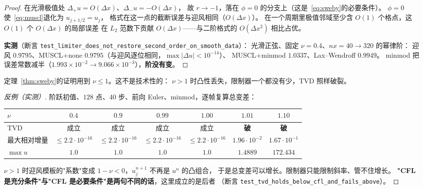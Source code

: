 \begin{proof}
在光滑极值处 $\Delta_+u=O(\Delta x)$、$\Delta_-u=-O(\Delta x)$，
故 $r\to-1$，落在 $\phi=0$ 的分支上（这是~\eqref{eq:sweby}的必要条件）。
$\phi=0$ 使~\eqref{eq:muscl}退化为 $u_{j+1/2}=u_j$，
格式在这一点的截断误差与迎风相同（$O(\Delta x)$）。
在一个周期里极值邻域至少含 $O(1)$ 个格点，这 $O(1)$ 个 $O(\Delta x)$ 的局部误差
在 $L_2$ 范数下贡献 $O(\Delta x)$——与二阶格式的 $O(\Delta x^2)$ 相比占优。

\textbf{实测}（断言 \texttt{test\_limiter\_does\_not\_restore\_second\_order\_on\_smooth\_data}）：
光滑正弦、固定 $\nu=0.4$、$nx=40\to320$ 的幂律阶：
迎风 $0.9795$、MUSCL$+$none $0.9795$（与迎风逐位相同，$\max|\Delta u|<10^{-14}$）、
MUSCL$+$minmod $\mathbf{1.0337}$、Lax--Wendroff $0.9949$。
minmod 把误差常数减半（$1.993\times10^{-2}\to9.066\times10^{-3}$），\textbf{阶没有变}。
\end{proof}

\begin{theorem}
\label{thm:cfl-tvd}
定理~\ref{thm:sweby}的证明用到 $\nu\le1$。这不是技术性的：
$\nu>1$ 时凸性丢失，限制器一个都没有少，TVD 照样破裂。
\end{theorem}

\begin{proof}[反例（实测）]
阶跃初值、$128$ 点、$40$ 步、前向 Euler、minmod，逐帧复算总变差：

\begin{center}
\begin{tabular}{lcccccc}
\hline
$\nu$ & $0.4$ & $0.9$ & $0.99$ & $1.00$ & $1.01$ & $1.10$\\
\hline
TVD & 成立 & 成立 & 成立 & 成立 & \textbf{破} & \textbf{破}\\
最大相对增量 & $\le2.2\cdot10^{-16}$ & $\le2.2\cdot10^{-16}$ & $\le2.2\cdot10^{-16}$
& $\le2.2\cdot10^{-16}$ & $1.96\cdot10^{-2}$ & $1.67\cdot10^{-1}$\\
$\max u$ & $1.0$ & $1.0$ & $1.0$ & $1.0$ & $1.4889$ & $172.434$\\
\hline
\end{tabular}
\end{center}

$\nu>1$ 时迎风模板的"系数"变成 $1-\nu<0$，$u_j^{n+1}$ 不再是 $u^n$ 的凸组合，
于是总变差可以增长。限制器只能限制斜率、管不住增长。
\textbf{"CFL 是充分条件"与"CFL 是必要条件"是两句不同的话}，这里成立的是后者
（断言 \texttt{test\_tvd\_holds\_below\_cfl\_and\_fails\_above}）。
\end{proof}

